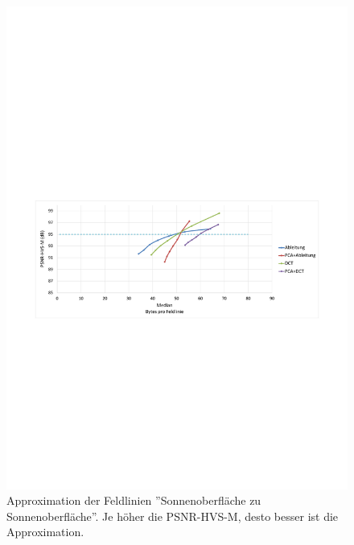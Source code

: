 \begin{figure}[!htbp]
	\center	\includegraphics[trim = 1.8cm 11cm 1.8cm 12.5cm, clip=true,width=1\textwidth,keepaspectratio]{./pictures/resultate/loesung1/ringing/sts.pdf}
	\caption{Approximation der Feldlinien ''Sonnenoberfläche zu Sonnenoberfläche''. Je höher die PSNR-HVS-M, desto besser ist die Approximation. }	\label{resultate:loesung1:dct:behandlung_ringing:sts}
\end{figure} 
